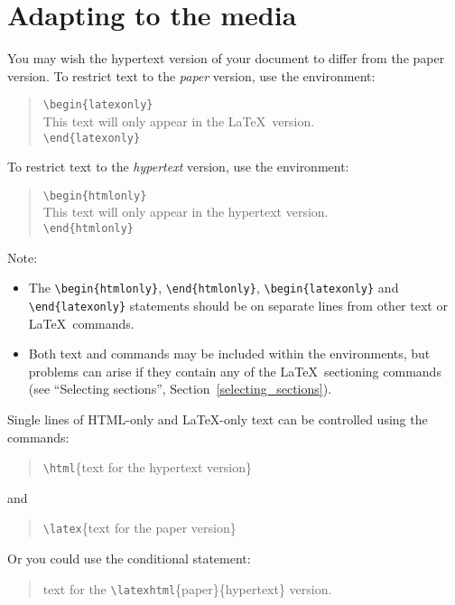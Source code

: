 \documentclass[twoside,11pt]{article}
\newcommand{\htmlref}[2]{#1}
\newcommand{\latex}[1]{#1}
\newcommand{\html}[1]{}
\newcommand{\latexhtml}[2]{#1}
\newcommand{\xlabel}[1]{}
\renewcommand{\_}{\texttt{\symbol{95}}}
\begin{document}
\section{\xlabel{adapting_to_the_media}\label{conditional_text}Adapting to the media}

You may wish the hypertext version of your document to differ from the paper
version.
To restrict text to the \emph{paper}\/ version, use the environment:

\begin{quote}
\verb!\begin!\verb!{latexonly}!\\
This text will only appear in the \LaTeX\ version. \\
\verb!\end!\verb!{latexonly}!
\end{quote}

To restrict text to the \emph{hypertext}\/ version, use the environment:

\begin{quote}
\verb!\begin!\verb!{htmlonly}!\\
This text will only appear in the hypertext version. \\
\verb!\end!\verb!{htmlonly}!
\end{quote}

Note:

\begin{itemize} 
\item The \verb!\begin!\verb!{htmlonly}!, \verb!\end!\verb!{htmlonly}!,
  \verb!\begin!\verb!{latexonly}! and \verb!\end!\verb!{latexonly}!
  statements should be on separate lines from other text or \LaTeX\ commands.
\item Both text and commands may be included within the environments,
  but problems can arise if they contain any of the \LaTeX\ sectioning commands
  (see
  \htmlref{``Selecting sections''}{selecting_sections}\latex{, Section~\ref{selecting_sections}}).
\end{itemize}

Single lines of HTML-only and \LaTeX\--only text can be controlled
using the commands:
\begin{quote}
\verb!\html!\{text for the hypertext version\}
\end{quote}
and
\begin{quote}
\verb!\latex!\{text for the paper version\}
\end{quote}
Or you could use the conditional statement:
\begin{quote}
text for the \verb!\latexhtml!\{paper\}\{hypertext\} version.
\end{quote}
\end{document}
